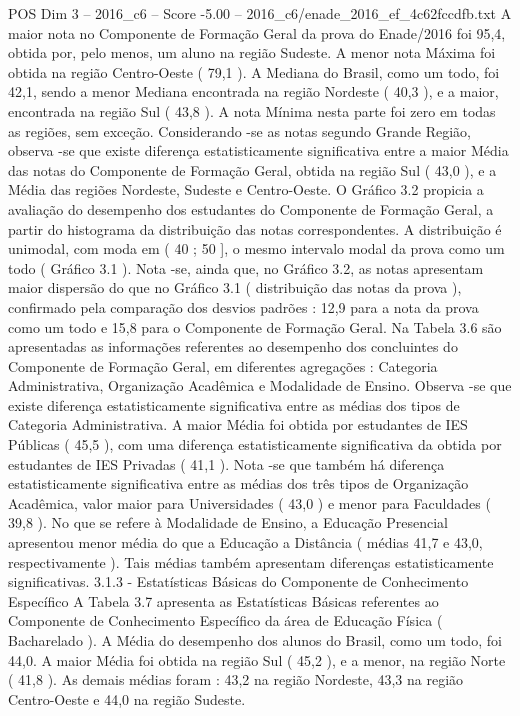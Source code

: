 \begin{textsample}{POS Dim 3 – 2016\_c6 – Score -5.00 – 2016\_c6/enade\_2016\_ef\_4c62fccdfb.txt}
A maior nota no Componente de Formação Geral da prova do Enade/2016 foi 95,4, obtida por, pelo menos, um aluno na região Sudeste.
A menor nota Máxima foi obtida na região Centro-Oeste ( 79,1 ).
A Mediana do Brasil, como um todo, foi 42,1, sendo a menor Mediana encontrada na região Nordeste ( 40,3 ), e a maior, encontrada na região Sul ( 43,8 ).
A nota Mínima nesta parte foi zero em todas as regiões, sem exceção.
Considerando -se as notas segundo Grande Região, observa -se que existe diferença estatisticamente significativa entre a maior Média das notas do Componente de Formação Geral, obtida na região Sul ( 43,0 ), e a Média das regiões Nordeste, Sudeste e Centro-Oeste.
O Gráfico 3.2 propicia a avaliação do desempenho dos estudantes do Componente de Formação Geral, a partir do histograma da distribuição das notas correspondentes.
A distribuição é unimodal, com moda em ( 40 ; 50 ], o mesmo intervalo modal da prova como um todo ( Gráfico 3.1 ).
Nota -se, ainda que, no Gráfico 3.2, as notas apresentam maior dispersão do que no Gráfico 3.1 ( distribuição das notas da prova ), confirmado pela comparação dos desvios padrões : 12,9 para a nota da prova como um todo e 15,8 para o Componente de Formação Geral.
Na Tabela 3.6 são apresentadas as informações referentes ao desempenho dos concluintes do Componente de Formação Geral, em diferentes agregações : Categoria Administrativa, Organização Acadêmica e Modalidade de Ensino.
Observa -se que existe diferença estatisticamente significativa entre as médias dos tipos de Categoria Administrativa.
A maior Média foi obtida por estudantes de IES Públicas ( 45,5 ), com uma diferença estatisticamente significativa da obtida por estudantes de IES Privadas ( 41,1 ).
Nota -se que também há diferença estatisticamente significativa entre as médias dos três tipos de Organização Acadêmica, valor maior para Universidades ( 43,0 ) e menor para Faculdades ( 39,8 ).
No que se refere à Modalidade de Ensino, a Educação Presencial apresentou menor média do que a Educação a Distância ( médias 41,7 e 43,0, respectivamente ).
Tais médias também apresentam diferenças estatisticamente significativas. 3.1.3 - Estatísticas Básicas do Componente de Conhecimento Específico A Tabela 3.7 apresenta as Estatísticas Básicas referentes ao Componente de Conhecimento Específico da área de Educação Física ( Bacharelado ).
A Média do desempenho dos alunos do Brasil, como um todo, foi 44,0.
A maior Média foi obtida na região Sul ( 45,2 ), e a menor, na região Norte ( 41,8 ).
As demais médias foram : 43,2 na região Nordeste, 43,3 na região Centro-Oeste e 44,0 na região Sudeste.

\end{textsample}
